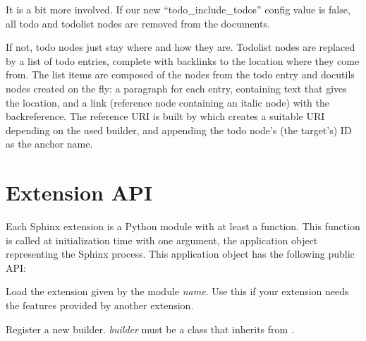\documentclass[letterpaper,10pt,english]{sphinxmanual}
\begin{document}
It is a bit more involved.  If our new ``todo\_include\_todos'' config value is
false, all todo and todolist nodes are removed from the documents.

If not, todo nodes just stay where and how they are.  Todolist nodes are
replaced by a list of todo entries, complete with backlinks to the location
where they come from.  The list items are composed of the nodes from the todo
entry and docutils nodes created on the fly: a paragraph for each entry,
containing text that gives the location, and a link (reference node containing
an italic node) with the backreference.  The reference URI is built by
 which creates a suitable URI depending on the
used builder, and appending the todo node's (the target's) ID as the anchor
name.


\section{Extension API}
\label{ext/appapi:extension-api}\label{ext/appapi::doc}
Each Sphinx extension is a Python module with at least a  function.
This function is called at initialization time with one argument, the
application object representing the Sphinx process.  This application object has
the following public API:

\begin{fulllineitems}
\label{ext/appapi:sphinx.application.Sphinx.setup_extension}
Load the extension given by the module \emph{name}.  Use this if your extension
needs the features provided by another extension.

\end{fulllineitems}


\begin{fulllineitems}
\label{ext/appapi:sphinx.application.Sphinx.add_builder}
Register a new builder.  \emph{builder} must be a class that inherits from
{\hyperref[ext/builderapi:sphinx.builders.Builder]{}}.

\end{fulllineitems}

\end{document}

